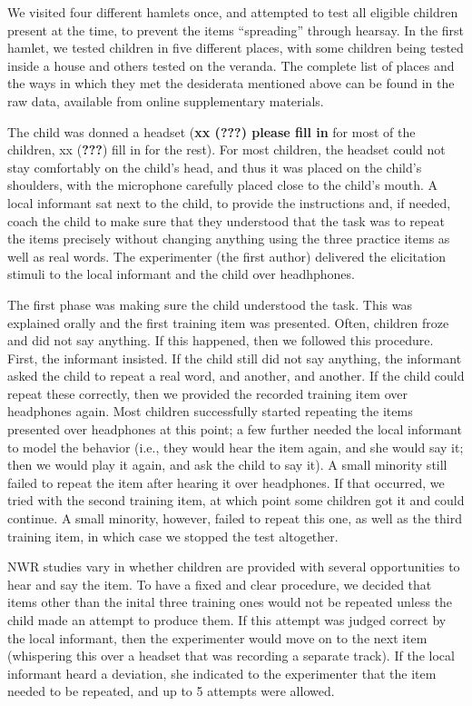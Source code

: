 \documentclass[english,,man,floatsintext]{apa6}
\begin{document}
We visited four different hamlets once, and attempted to test all eligible children present at the time, to prevent the items \enquote{spreading} through hearsay. In the first hamlet, we tested children in five different places, with some children being tested inside a house and others tested on the veranda. The complete list of places and the ways in which they met the desiderata mentioned above can be found in the raw data, available from online supplementary materials.

The child was donned a headset (\textbf{xx ({\textbf{???}}) please fill in} for most of the children, xx ({\textbf{???}}) fill in for the rest). For most children, the headset could not stay comfortably on the child's head, and thus it was placed on the child's shoulders, with the microphone carefully placed close to the child's mouth. A local informant sat next to the child, to provide the instructions and, if needed, coach the child to make sure that they understood that the task was to repeat the items precisely without changing anything using the three practice items as well as real words. The experimenter (the first author) delivered the elicitation stimuli to the local informant and the child over headhphones.

The first phase was making sure the child understood the task. This was explained orally and the first training item was presented. Often, children froze and did not say anything. If this happened, then we followed this procedure. First, the informant insisted. If the child still did not say anything, the informant asked the child to repeat a real word, and another, and another. If the child could repeat these correctly, then we provided the recorded training item over headphones again. Most children successfully started repeating the items presented over headphones at this point; a few further needed the local informant to model the behavior (i.e., they would hear the item again, and she would say it; then we would play it again, and ask the child to say it). A small minority still failed to repeat the item after hearing it over headphones. If that occurred, we tried with the second training item, at which point some children got it and could continue. A small minority, however, failed to repeat this one, as well as the third training item, in which case we stopped the test altogether.

NWR studies vary in whether children are provided with several opportunities to hear and say the item. To have a fixed and clear procedure, we decided that items other than the inital three training ones would not be repeated unless the child made an attempt to produce them. If this attempt was judged correct by the local informant, then the experimenter would move on to the next item (whispering this over a headset that was recording a separate track). If the local informant heard a deviation, she indicated to the experimenter that the item needed to be repeated, and up to 5 attempts were allowed.
\end{document}
